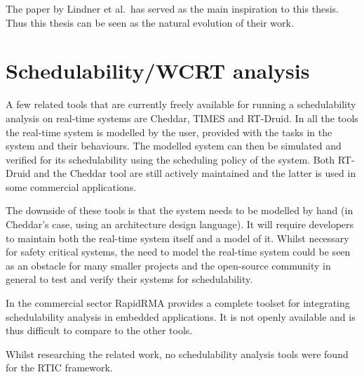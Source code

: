 The paper by Lindner et al.\ has served as the main inspiration to this thesis.
Thus this thesis can be seen as the natural evolution of their work.

\section{Schedulability/WCRT analysis}
A few related tools that are currently freely available for running a
schedulability analysis on real-time systems are Cheddar\cite{cheddar},
TIMES\cite{timestool} and RT-Druid\cite{rtdruid}. In all the tools the
real-time system is modelled by the user, provided with the tasks in the system
and their behaviours. The modelled system can then be simulated and verified
for its schedulability using the scheduling policy of the system. Both RT-Druid
and the Cheddar tool are still actively maintained and the latter is used in
some commercial applications\cite{ellidiss}.

The downside of these tools is that the system needs to be modelled by hand
(in Cheddar's case, using an architecture design language). It will require
developers to maintain both the real-time system itself and a model of it.
Whilst necessary for safety critical systems, the need to model the real-time
system could be seen as an obstacle for many smaller projects and the
open-source community in general to test and verify their systems for
schedulability.

In the commercial sector RapidRMA\cite{rapidrma} provides a complete toolset
for integrating schedulability analysis in embedded applications. It is not
openly available and is thus difficult to compare to the other tools.

Whilst researching the related work, no schedulability analysis tools were
found for the RTIC framework.
